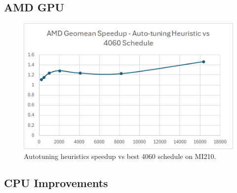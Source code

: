 \subsection{AMD GPU}
\begin{figure}[htb]
  \centering
  \includegraphics[width=0.75\linewidth]{figures/AMD_MI210_ATHeuristicVs4060Sched_speedup.png}
  \caption{Autotuning heuristics speedup vs best 4060 schedule on MI210.}
  \label{Fig:AMD_MI210_ATHeuristicVs4060Sched_speedup}
\end{figure}

\subsection{CPU Improvements}
